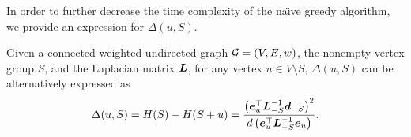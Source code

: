 \documentclass[10pt,twocolumn,twoside]{IEEEtran}
\begin{document}

In order to further decrease the time complexity of the na\"{\i}ve greedy algorithm, we provide an expression for \(\Delta(u,S)\).
\begin{lemma}\label{lem:delta}
    Given a connected weighted undirected graph \(\mathcal{G}=(V,E,w)\), the nonempty vertex group \(S\), and the Laplacian matrix \(\boldsymbol{L}\), for any vertex \(u\in V\setminus S\),  \(\Delta(u,S)\) can be alternatively expressed as
    \begin{equation}\label{eq:delta}
        \Delta(u,S)=   H(S)-H(S+u)=\frac{\left( \boldsymbol{e}_u^\top\boldsymbol{L}_{-S}^{-1}\boldsymbol{d}_{-S} \right)^2}{d\left( \boldsymbol{e}_u^\top\boldsymbol{L}_{-S}^{-1}\boldsymbol{e}_u \right)}.
    \end{equation}
\end{lemma}
\end{document}
